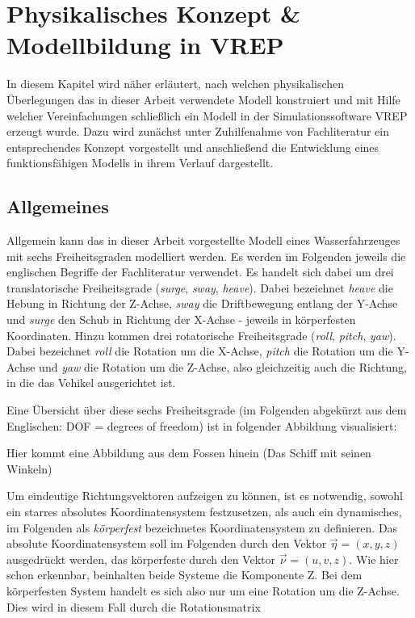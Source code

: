 %
\chapter{Physikalisches Konzept & Modellbildung in VREP}
In diesem Kapitel wird näher erläutert, nach welchen physikalischen Überlegungen das in dieser Arbeit verwendete Modell konstruiert und mit Hilfe welcher Vereinfachungen schließlich ein Modell in der Simulationssoftware VREP erzeugt wurde. Dazu wird zunächst unter Zuhilfenahme von Fachliteratur ein entsprechendes Konzept vorgestellt und anschließend die Entwicklung eines funktionsfähigen Modells in ihrem Verlauf dargestellt.
%
\section{Allgemeines}
%
Allgemein kann das in dieser Arbeit vorgestellte Modell eines Wasserfahrzeuges mit sechs Freiheitsgraden modelliert werden. Es werden im Folgenden jeweils die englischen Begriffe der Fachliteratur verwendet. Es handelt sich dabei um drei translatorische Freiheitsgrade (\textit{surge}, \textit{sway}, \textit{heave}). Dabei bezeichnet \textit{heave} die Hebung in Richtung der Z-Achse, \textit{sway} die Driftbewegung entlang der Y-Achse und \textit{surge} den Schub in Richtung der X-Achse - jeweils in körperfesten Koordinaten. Hinzu kommen drei rotatorische Freiheitsgrade (\textit{roll}, \textit{pitch}, \textit{yaw}). Dabei bezeichnet \textit{roll} die Rotation um die X-Achse, \textit{pitch} die Rotation um die Y-Achse und \textit{yaw} die Rotation um die Z-Achse, also gleichzeitig auch die Richtung, in die das Vehikel ausgerichtet ist. 

Eine Übersicht über diese sechs Freiheitsgrade (im Folgenden abgekürzt aus dem Englischen: DOF = degrees of freedom) ist in folgender Abbildung visualisiert:


Hier kommt eine Abbildung aus dem Fossen hinein (Das Schiff mit seinen Winkeln)



Um eindeutige Richtungsvektoren aufzeigen zu können, ist es notwendig, sowohl ein starres absolutes Koordinatensystem festzusetzen, als auch ein dynamisches, im Folgenden als \textit{körperfest} bezeichnetes Koordinatensystem zu definieren. 
Das absolute Koordinatensystem soll im Folgenden durch den Vektor $\vec{\eta} = \left( x, y, z \right)$ ausgedrückt werden, das körperfeste durch den Vektor $\vec{\nu} = \left( u, v, z \right)$. Wie hier schon erkennbar, beinhalten beide Systeme die Komponente Z. Bei dem körperfesten System handelt es sich also nur um eine Rotation um die Z-Achse. Dies wird in diesem Fall durch die Rotationsmatrix 

